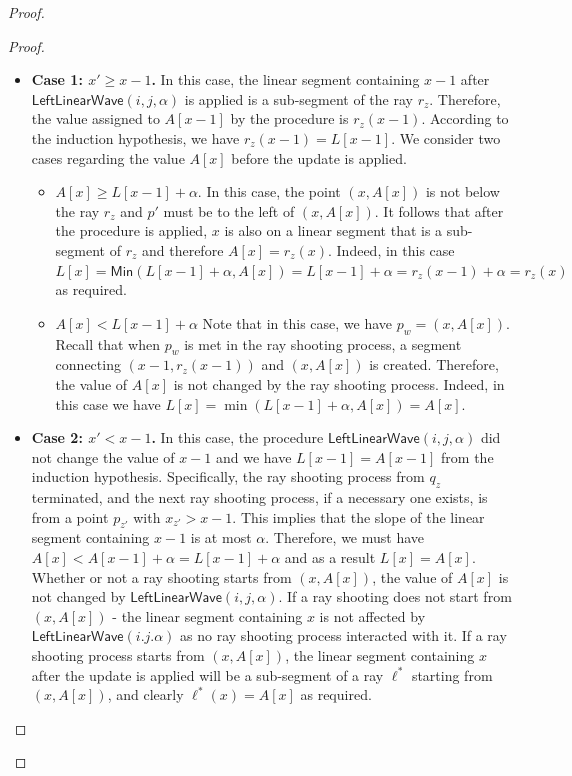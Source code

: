 \documentclass[a4paper,UKenglish,cleveref, autoref, thm-restate]{lipics-v2021}
\newcommand{\LLW}{\mathsf{LeftLinearWave}}
\newcommand{\Min}{\mathsf{Min}}
\newcommand{\ray}{r}
\begin{document}
\begin{proof}
\begin{proof}
\begin{itemize}
    \item \textbf{Case 1: $x' \ge x-1$.}
    In this case, the linear segment containing $x-1$ after $\LLW(i,j,\alpha)$ is applied is a sub-segment of the ray $\ray_z$. 
    Therefore, the value assigned to $A[x-1]$ by the procedure is $\ray_z(x-1)$.
    According to the induction hypothesis, we have $\ray_z(x-1) = L[x-1]$.
    We consider two cases regarding the value $A[x]$ before the update is applied.
    \begin{itemize}
        \item \textbf{$A[x] \ge L[x-1] + \alpha$}. In this case, the point $(x,A[x])$ is not below the ray $\ray_z$ and $p'$ must be to the left of $(x,A[x])$.
        It follows that after the procedure is applied, $x$ is also on a linear segment that is a sub-segment of $\ray_z$ and therefore $A[x] = \ray_z(x)$. 
        Indeed, in this case $L[x] = \Min(L[x-1] + \alpha,A[x]) = L[x-1] + \alpha = \ray_z(x-1) + \alpha = \ray_z(x)$ as required.
        \item \textbf{$A[x] < L[x-1] + \alpha$} Note that in this case, we have $p_w = (x,A[x])$.
        Recall that when $p_w$ is met in the ray shooting process, a segment connecting $(x-1,\ray_z(x-1))$ and $(x,A[x])$ is created.
        Therefore, the value of $A[x]$ is not changed by the ray shooting process.
        Indeed, in this case we have $L[x] = \min(L[x-1] + \alpha,A[x]) = A[x]$.
    \end{itemize}
    \item \textbf{Case 2: $x' < x-1$.}
    In this case, the procedure $\LLW(i,j,\alpha)$ did not change the value of $x-1$ and we have $L[x-1] = A[x-1]$ from the induction hypothesis.
    Specifically, the ray shooting process from $q_z$ terminated, and the next ray shooting process, if a necessary one exists, is from a point $p_{z'}$ with $x_{z'} > x-1$.
    This implies that the slope of the linear segment containing $x-1$ is at most $\alpha$.
    Therefore, we must have $A[x]< A[x-1] + \alpha =L[x-1] + \alpha$ and as a result $L[x] = A[x]$.
    Whether or not a ray shooting starts from $(x,A[x])$, the value of $A[x]$ is not changed by $\LLW(i,j,\alpha)$.
    If a ray shooting does not start from $(x,A[x])$ - the linear segment containing $x$ is not affected by $\LLW(i.j.\alpha)$ as no ray shooting process interacted with it.
    If a ray shooting process starts from $(x,A[x])$, the linear segment containing $x$ after the update is applied will be a sub-segment of a ray $\ell^*$ starting from $(x,A[x])$, and clearly $\ell^*(x) = A[x]$ as required.\qedhere 
\end{itemize}
\end{proof}


\end{proof}
\end{document}
